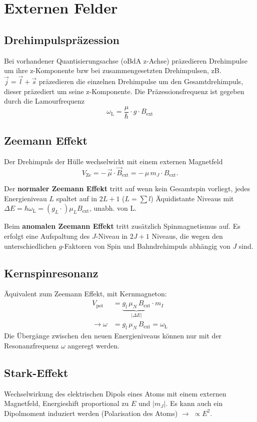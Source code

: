 \section{Externen Felder}
\subsection{Drehimpulspräzession}
Bei vorhandener Quantisierungsachse (oBdA z-Achse) präzedieren Drehimpulse um ihre z-Komponente bzw bei zusammengesetzten Drehimpulsen, zB. $\vec{j} = \vec{l} + \vec{s}$ präzedieren die einzelnen Drehimpulse um den Gesamtdrehimpuls, dieser präzediert um seine z-Komponente.
Die Präzessionsfrequenz ist gegeben durch die Lamourfrequenz
\begin{equation*}
	\omega_\text{L} = \frac{\mu}{\hbar} \cdot g \cdot B_\text{ext}
\end{equation*}

\subsection{Zeemann Effekt}
Der Drehimpuls der Hülle wechselwirkt mit einem externen Magnetfeld
\begin{equation*}
	V_\text{Ze} = - \, \vec{\mu} \cdot \vec{B}_\text{ext} = - \, \mu \, m_J \cdot B_\text{ext}.
\end{equation*}

Der \textbf{normaler Zeemann Effekt} tritt auf wenn kein Gesamtspin vorliegt, jedes Energieniveau $L$ spaltet auf in $2L + 1$ ($L = \sum l$) Äquidistante Niveaus mit $\Delta E = \hbar \omega_\text{L} = (g_L \cdot) \mu_L B_\text{ext}$, unabh. von L.

Beim \textbf{anomalen Zeemann Effekt} tritt zusätzlich Spinmagnetismus auf. Es erfolgt eine Aufspaltung des $J$-Niveau in $2J + 1$ Niveaus, die wegen den unterschiedlichen $g$-Faktoren von Spin und Bahndrehimpuls abhängig von $J$ sind.

\subsection{Kernspinresonanz}

Äquivalent zum Zeemann Effekt, mit Kernmagneton:
\begin{align*}
	V_\text{pot} &= \underbrace{g_l \, \mu_N \, B_\text{ext}}_{|\Delta E|} \cdot m_I\\
	\rightarrow \omega &= g_l \, \mu_N \, B_\text{ext} = \omega_\text{L}
\end{align*}
Die Übergänge zwischen den neuen Energieniveaus können nur mit der Resonanzfrequenz $\omega$ angeregt werden.

\subsection{Stark-Effekt}

Wechselwirkung des elektrischen Dipols eines Atoms mit einem externen Magnetfeld, Energieshift proportional zu $E$ und $|m_J|$.
Es kann auch ein Dipolmoment induziert werden (Polarisation des Atoms) $\rightarrow \; \propto E^2$.
